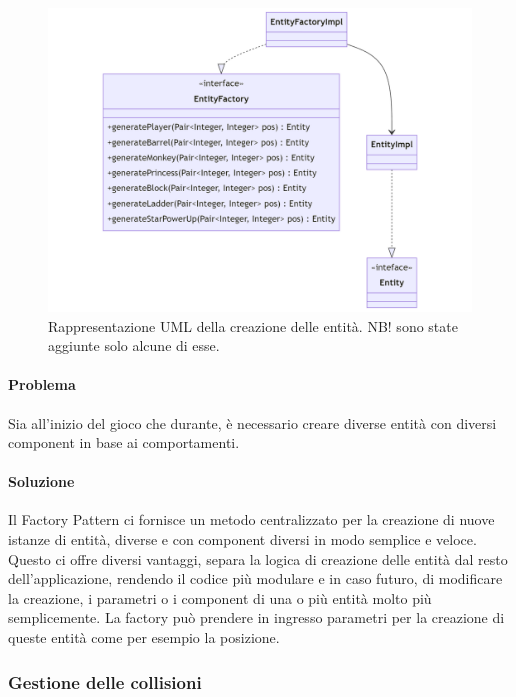\documentclass[a4paper,12pt]{report}
\begin{document}
\begin{figure}[H]
\centering{}
\includegraphics[width=\textwidth]{img/entityfactory.png}
\caption{Rappresentazione UML della creazione delle entità. NB! sono state aggiunte solo alcune di esse.}
\end{figure}

\paragraph{Problema} Sia all’inizio del gioco che durante, è necessario creare diverse entità con diversi component in base ai comportamenti.

\paragraph{Soluzione} Il Factory Pattern ci fornisce un metodo centralizzato per la creazione di nuove istanze di entità, diverse e con component diversi in modo semplice e veloce. Questo ci offre diversi vantaggi, separa la logica di creazione delle entità dal resto dell’applicazione, rendendo il codice più modulare e in caso futuro, di modificare la creazione, i parametri o i component di una o più entità molto più semplicemente. La factory può prendere in ingresso parametri per la creazione di queste entità come per esempio la posizione.

\subsubsection{Gestione delle collisioni}
\end{document}
